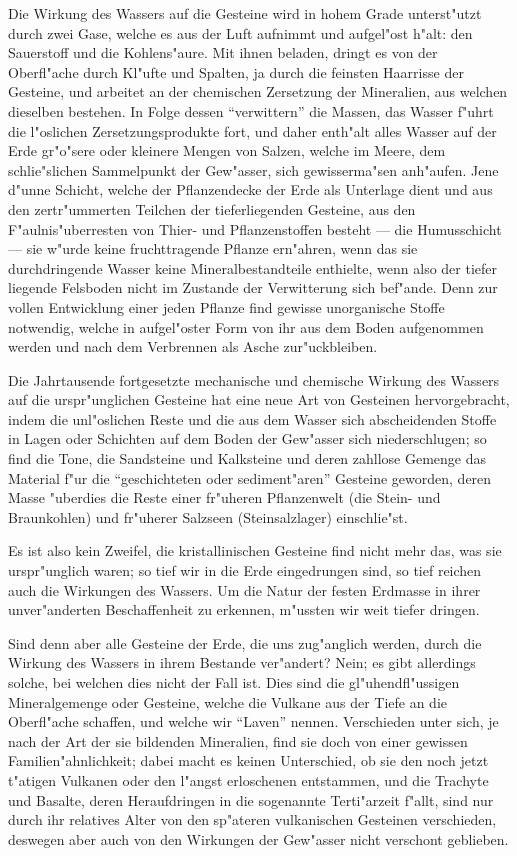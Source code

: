 \documentclass[a4paper, 11pt, oneside, german]{article}
\begin{document}
Die Wirkung des Wassers auf die Gesteine wird in hohem Grade unterst"utzt durch zwei Gase, welche es aus der Luft aufnimmt und aufgel"ost h"alt: den Sauerstoff und die Kohlens"aure. Mit ihnen beladen, dringt es von der Oberfl"ache durch Kl"ufte und Spalten, ja durch die feinsten Haarrisse der Gesteine, und arbeitet an der chemischen Zersetzung der Mineralien, aus welchen dieselben bestehen. In Folge dessen "`verwittern"' die Massen, das Wasser f"uhrt die l"oslichen Zersetzungsprodukte fort, und daher enth"alt alles Wasser auf der Erde gr"o"sere oder kleinere Mengen von Salzen, welche im Meere, dem schlie"slichen Sammelpunkt der Gew"asser, sich gewisserma"sen anh"aufen. Jene d"unne Schicht, welche der Pflanzendecke der Erde als Unterlage dient und aus den zertr"ummerten Teilchen der tieferliegenden Gesteine, aus den F"aulnis"uberresten von Thier- und Pflanzenstoffen besteht --- die Humusschicht --- sie w"urde keine fruchttragende Pflanze ern"ahren, wenn das sie durchdringende Wasser keine Mineralbestandteile enthielte, wenn also der tiefer liegende Felsboden nicht im Zustande der Verwitterung sich bef"ande. Denn zur vollen Entwicklung einer jeden Pflanze find gewisse unorganische Stoffe notwendig, welche in aufgel"oster Form von ihr aus dem Boden aufgenommen werden und nach dem Verbrennen als Asche zur"uckbleiben.

Die Jahrtausende fortgesetzte mechanische und chemische Wirkung des Wassers auf die urspr"unglichen Gesteine hat eine neue Art von Gesteinen hervorgebracht, indem die unl"oslichen Reste und die aus dem Wasser sich abscheidenden Stoffe in Lagen oder Schichten auf dem Boden der Gew"asser sich niederschlugen; so find die Tone, die Sandsteine und Kalksteine und deren zahllose Gemenge das Material f"ur die "`geschichteten oder sediment"aren"' Gesteine geworden, deren Masse "uberdies die Reste einer fr"uheren Pflanzenwelt (die Stein- und Braunkohlen) und fr"uherer Salzseen (Steinsalzlager) einschlie"st.

Es ist also kein Zweifel, die kristallinischen Gesteine find nicht mehr das, was sie urspr"unglich waren; so tief wir in die Erde eingedrungen sind, so tief reichen auch die Wirkungen des Wassers. Um die Natur der festen Erdmasse in ihrer unver"anderten Beschaffenheit zu erkennen, m"ussten wir weit tiefer dringen.

Sind denn aber alle Gesteine der Erde, die uns zug"anglich werden, durch die Wirkung des Wassers in ihrem Bestande ver"andert? Nein; es gibt allerdings solche, bei welchen dies nicht der Fall ist. Dies sind die gl"uhendfl"ussigen Mineralgemenge oder Gesteine, welche die Vulkane aus der Tiefe an die Oberfl"ache schaffen, und welche wir "`Laven"' nennen. Verschieden unter sich, je nach der Art der sie bildenden Mineralien, find sie doch von einer gewissen Familien"ahnlichkeit; dabei macht es keinen Unterschied, ob sie den noch jetzt t"atigen Vulkanen oder den l"angst erloschenen entstammen, und die Trachyte und Basalte, deren Heraufdringen in die sogenannte Terti"arzeit f"allt, sind nur durch ihr relatives Alter von den sp"ateren vulkanischen Gesteinen verschieden, deswegen aber auch von den Wirkungen der Gew"asser nicht verschont geblieben.
\end{document}
